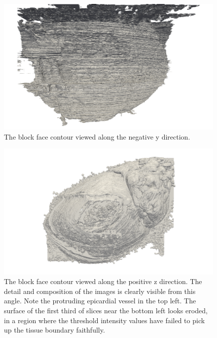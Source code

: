     \begin{figure}
      \centering
      \includegraphics[width=\textheight]{Ch5/Figs/Rat28/contours/LoRes_negative_y}
      \caption{The block face contour viewed along the negative y direction.}
      \label{fig:LoRes_negative_y}
    \end{figure}
    
    \begin{figure}
      \centering
      \includegraphics[width=\textheight]{Ch5/Figs/Rat28/contours/LoRes_positive_z}
      \caption{The block face contour viewed along the positive z direction. The detail and composition of the images is clearly visible from this angle. Note the protruding epicardial vessel in the top left. The surface of the first third of slices near the bottom left looks eroded, in a region where the threshold intensity values have failed to pick up the tissue boundary faithfully.}
      \label{fig:LoRes_positive_z}
    \end{figure}
    
